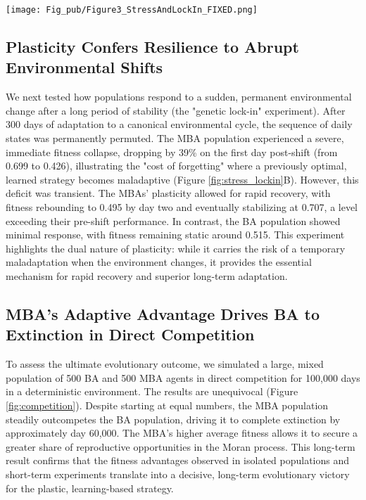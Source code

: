 \documentclass[aps,pre,twocolumn,floatfix,nofootinbib,amsmath,amssymb]{revtex4-2}
\begin{document}
\begin{figure*}[t]
    \centering
    \texttt{[image: Fig\_pub/Figure3\_StressAndLockIn\_FIXED.png]}
    \caption{\textbf{Environmental Stress and Genetic Lock-in.} \textbf{A)} Fitness as a function of environmental stochasticity (\(\varepsilon\)). The MBA advantage erodes as the environment becomes unpredictable, with a crossover point at \(\varepsilon \approx 0.2\). \textbf{B)} Response to a sudden environmental shift after 300 days. MBA fitness initially collapses (the "cost of forgetting") but rapidly recovers to a level exceeding its pre-shift performance. BA fitness remains largely static. \textbf{C, D)} Muller plots for the MBA population during the stress test and lock-in experiment, respectively, showing the dynamics of genotype evolution.}
    \label{fig:stress_lockin}
\end{figure*}

\subsection{Plasticity Confers Resilience to Abrupt Environmental Shifts}
We next tested how populations respond to a sudden, permanent environmental change after a long period of stability (the "genetic lock-in" experiment). After 300 days of adaptation to a canonical environmental cycle, the sequence of daily states was permanently permuted. The MBA population experienced a severe, immediate fitness collapse, dropping by 39\% on the first day post-shift (from 0.699 to 0.426), illustrating the "cost of forgetting" where a previously optimal, learned strategy becomes maladaptive (Figure \ref{fig:stress_lockin}B). However, this deficit was transient. The MBAs' plasticity allowed for rapid recovery, with fitness rebounding to 0.495 by day two and eventually stabilizing at 0.707, a level exceeding their pre-shift performance. In contrast, the BA population showed minimal response, with fitness remaining static around 0.515. This experiment highlights the dual nature of plasticity: while it carries the risk of a temporary maladaptation when the environment changes, it provides the essential mechanism for rapid recovery and superior long-term adaptation.

\subsection{MBA's Adaptive Advantage Drives BA to Extinction in Direct Competition}
To assess the ultimate evolutionary outcome, we simulated a large, mixed population of 500 BA and 500 MBA agents in direct competition for 100,000 days in a deterministic environment. The results are unequivocal (Figure \ref{fig:competition}). Despite starting at equal numbers, the MBA population steadily outcompetes the BA population, driving it to complete extinction by approximately day 60,000. The MBA's higher average fitness allows it to secure a greater share of reproductive opportunities in the Moran process. This long-term result confirms that the fitness advantages observed in isolated populations and short-term experiments translate into a decisive, long-term evolutionary victory for the plastic, learning-based strategy.
\end{document}
